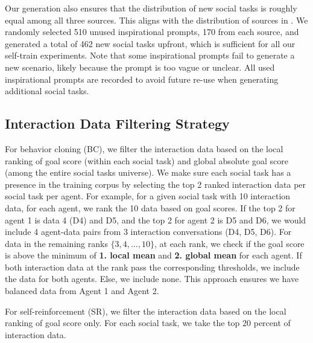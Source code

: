 Our generation also ensures that the distribution of new social tasks is roughly equal among all three sources. This aligns with the distribution of sources in \model. We randomly selected 510 unused inspirational prompts, 170 from each source, and generated a total of 462 new social tasks upfront, which is sufficient for all our self-train experiments. Note that some inspirational prompts fail to generate a new scenario, likely because the prompt is too vague or unclear. All used inspirational prompts are recorded to avoid future re-use when generating additional social tasks. 

\subsection{Interaction Data Filtering Strategy}
\label{appendix:data-filtering-strategy}
For behavior cloning (BC), we filter the interaction data based on the local ranking of goal score (within each social task) and global absolute goal score (among the entire social tasks universe). We make sure each social task has a presence in the training corpus by selecting the top 2 ranked interaction data per social task per agent. For example, for a given social task with 10 interaction data, for each agent, we rank the 10 data based on goal scores. If the top 2 for agent 1 is data 4 (D4) and D5, and the top 2 for agent 2 is D5 and D6, we would include 4 agent-data pairs from 3 interaction conversations (D4, D5, D6). For data in the remaining ranks $\{3, 4, ..., 10\}$, at each rank, we check if the goal score is above the minimum of \textbf{1. local mean} and \textbf{2. global mean} for each agent. If both interaction data at the rank pass the corresponding thresholds, we include the data for both agents. Else, we include none. This approach ensures we have balanced data from Agent 1 and Agent 2.

For self-reinforcement (SR), we filter the interaction data based on the local ranking of goal score only. For each social task, we take the top 20 percent of interaction data.

